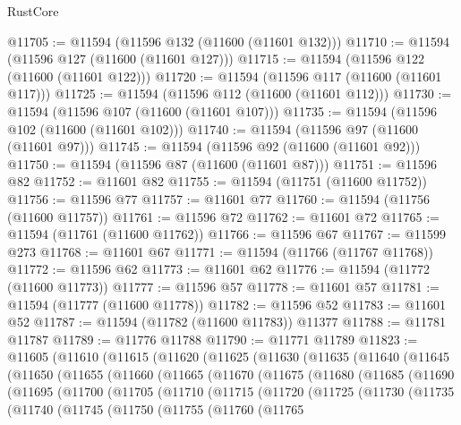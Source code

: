 \begin{lexlean}{RustCore}
\begin{coremodule}
@11705 := @11594 (@11596 @132 (@11600 (@11601 @132)))
@11710 := @11594 (@11596 @127 (@11600 (@11601 @127)))
@11715 := @11594 (@11596 @122 (@11600 (@11601 @122)))
@11720 := @11594 (@11596 @117 (@11600 (@11601 @117)))
@11725 := @11594 (@11596 @112 (@11600 (@11601 @112)))
@11730 := @11594 (@11596 @107 (@11600 (@11601 @107)))
@11735 := @11594 (@11596 @102 (@11600 (@11601 @102)))
@11740 := @11594 (@11596 @97 (@11600 (@11601 @97)))
@11745 := @11594 (@11596 @92 (@11600 (@11601 @92)))
@11750 := @11594 (@11596 @87 (@11600 (@11601 @87)))
@11751 := @11596 @82
@11752 := @11601 @82
@11755 := @11594 (@11751 (@11600 @11752))
@11756 := @11596 @77
@11757 := @11601 @77
@11760 := @11594 (@11756 (@11600 @11757))
@11761 := @11596 @72
@11762 := @11601 @72
@11765 := @11594 (@11761 (@11600 @11762))
@11766 := @11596 @67
@11767 := @11599 @273
@11768 := @11601 @67
@11771 := @11594 (@11766 (@11767 @11768))
@11772 := @11596 @62
@11773 := @11601 @62
@11776 := @11594 (@11772 (@11600 @11773))
@11777 := @11596 @57
@11778 := @11601 @57
@11781 := @11594 (@11777 (@11600 @11778))
@11782 := @11596 @52
@11783 := @11601 @52
@11787 := @11594 (@11782 (@11600 @11783)) @11377
@11788 := @11781 @11787
@11789 := @11776 @11788
@11790 := @11771 @11789
@11823 := @11605
    (@11610
      (@11615
        (@11620
          (@11625
            (@11630
              (@11635
                (@11640
                  (@11645
                    (@11650
                      (@11655
                        (@11660
                          (@11665
                            (@11670
                              (@11675
                                (@11680
                                  (@11685
                                    (@11690
                                      (@11695
                                        (@11700
                                          (@11705
                                            (@11710
                                              (@11715
                                                (@11720
                                                  (@11725
                                                    (@11730
                                                      (@11735
                                                        (@11740
                                                          (@11745
                                                            (@11750
                                                              (@11755
                                                                (@11760
                                                                  (@11765

\end{coremodule}
\end{lexlean}

